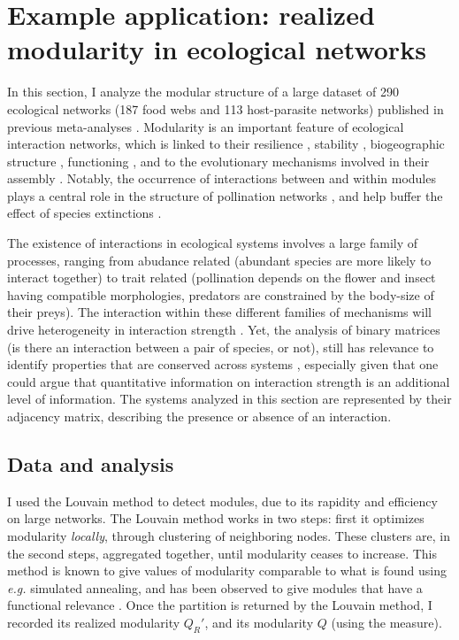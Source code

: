 \documentclass[12pt,oneside]{article}
\begin{document}
\section{Example application: realized modularity in ecological networks}

In this section, I analyze the modular structure of a large dataset of 290
ecological networks (187 food webs and 113 host-parasite networks) published in
previous meta-analyses \cite{gravel_trophic_2011,poisot_dissimilarity_2012}.
Modularity is an important feature of ecological interaction networks, which is
linked to their resilience
\cite{fortuna_nestedness_2010,stouffer_compartmentalization_2011}, stability
\parencite{thebault_identifying_2012}, biogeographic structure
\cite{flores_multi-scale_2012}, functioning \cite{thebault_food-web_2003}, and
to the evolutionary mechanisms involved in their assembly
\cite{flores_statistical_2011}. Notably, the occurrence of interactions between
and within modules plays a central role in the structure of pollination
networks \parencite{olesen_modularity_2007}, and help buffer the effect of
species extinctions \parencite{stouffer_compartmentalization_2011}.

The existence of interactions in ecological systems involves a large family of
processes, ranging from abudance related
\cite{bluthgen_measuring_2006,canard_emergence_2012} (abundant species are more
likely to interact together) to trait related
\cite{bartomeus_understanding_2013} (pollination depends on the flower and
insect having compatible morphologies, predators are constrained by the
body-size of their preys). The interaction within these different families of
mechanisms will drive heterogeneity in interaction strength
\cite{berlow_quantifying_1999}. Yet, the analysis of binary matrices (is there
an interaction between a pair of species, or not), still has relevance to
identify properties that are conserved across systems
\cite{dunne_network_2006}, especially given that one could argue that
quantitative information on interaction strength is an additional level of
information. The systems analyzed in this section are represented by their
adjacency matrix, describing the presence or absence of an interaction.

\subsection{Data and analysis}

I used the Louvain method \cite{blondel_fast_2008} to detect modules, due to
its rapidity and efficiency on large networks. The Louvain method works in two
steps: first it optimizes modularity \emph{locally}, through clustering of
neighboring nodes. These clusters are, in the second steps, aggregated
together, until modularity ceases to increase. This method is known to give
values of modularity comparable to what is found using \emph{e.g.} simulated
annealing, and has been observed to give modules that have a functional
relevance \cite{blondel_fast_2008}.  Once the partition is returned by the
Louvain method, I recorded its realized modularity $Q_R'$, and its modularity
$Q$ (using the \textcite{newman_finding_2004} measure).
\end{document}
